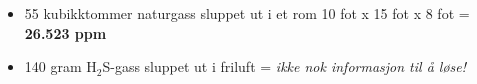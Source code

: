





\begin{itemize}
\item{} 55 kubikktommer naturgass sluppet ut i et rom 10 fot x 15 fot x 8 fot = {\bf 26.523 ppm}
\vskip 10pt
\item{} 140 gram H$_{2}$S-gass sluppet ut i friluft = {\it ikke nok informasjon til å løse!}
\end{itemize}



